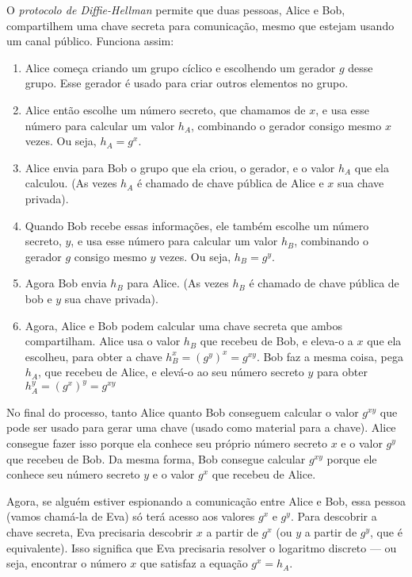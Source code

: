 O {\em protocolo de Diffie-Hellman} permite que duas pessoas, Alice e Bob, compartilhem uma chave secreta para comunicação, mesmo que estejam usando um canal público.
Funciona assim:
\begin{enumerate}
\item  Alice começa criando um grupo cíclico e escolhendo um gerador $g$ desse grupo.
  Esse gerador é usado para criar outros elementos no grupo.
\item Alice então escolhe um número secreto, que chamamos de $x$, e usa esse número para calcular um valor $h_A$, combinando o gerador consigo mesmo $x$ vezes.
  Ou seja, $h_A = g^x$.
\item Alice envia para Bob o grupo que ela criou, o gerador, e o valor $h_A$ que ela calculou.
(As vezes $h_A$ é chamado de chave pública de Alice e $x$ sua chave privada).
\item Quando Bob recebe essas informações, ele também escolhe um número secreto, $y$, e usa esse número para calcular um valor $h_B$, combinando o gerador $g$ consigo mesmo $y$ vezes.
  Ou seja, $h_B = g^y$.
\item Agora Bob envia $h_B$ para Alice.
  (As vezes $h_B$ é chamado de chave pública de bob e $y$ sua chave privada).
\item Agora, Alice e Bob podem calcular uma chave secreta que ambos compartilham.
  Alice usa o valor $h_B$ que recebeu de Bob, e eleva-o a $x$ que ela escolheu, para obter a chave $h_B^x = (g^y)^x = g^{xy}$.
  Bob faz a mesma coisa, pega $h_A$, que recebeu de Alice, e elevá-o ao seu número secreto $y$ para obter $h_A^y = (g^x)^y = g^{xy}$
\end{enumerate}

No final do processo, tanto Alice quanto Bob conseguem calcular o valor $g^{xy}$ que pode ser usado para gerar uma chave (usado como material para a chave).
Alice consegue fazer isso porque ela conhece seu próprio número secreto $x$ e o valor $g^y$ que recebeu de Bob.
Da mesma forma, Bob consegue calcular $g^{xy}$ porque ele conhece seu número secreto $y$ e o valor $g^x$ que recebeu de Alice.

Agora, se alguém estiver espionando a comunicação entre Alice e Bob, essa pessoa (vamos chamá-la de Eva) só terá acesso aos valores $g^x$ e $g^y$.
Para descobrir a chave secreta, Eva precisaria descobrir $x$ a partir de $g^x$ (ou $y$ a partir de $g^y$, que é equivalente).
Isso significa que Eva precisaria resolver o logaritmo discreto — ou seja, encontrar o número $x$ que satisfaz a equação $g^x = h_A$.

